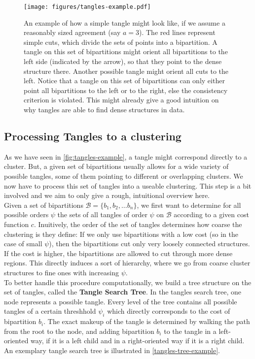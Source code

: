\begin{figure}[h]
    \centering
    \texttt{[image: figures/tangles-example.pdf]}
    \caption{An example of how a simple tangle might look like, if we assume a reasonably sized agreement (say $a = 3$). The red lines represent simple cuts, which divide the sets of points into a bipartition.
    A tangle on this set of bipartitions might orient all bipartitions to the left side (indicated by the arrow), so that they point to the dense structure there. Another 
possible tangle might orient all cuts to the left. Notice that a tangle on this set of bipartitions can only either point all bipartitions to the left or to the right, else
the consistency criterion is violated. This might already give a good intuition on why tangles are able to find dense structures in data.}
    \label{fig:tangles-example}
\end{figure}
\FloatBarrier

\subsection{Processing Tangles to a clustering}
As we have seen in \autoref{fig:tangles-example}, a tangle might correspond directly to a cluster. But, a given set of bipartitions usually allows for a wide 
variety of possible tangles, some of them pointing to different or overlapping clusters. We now have to process this set of tangles into a useable clustering.
This step is a bit involved and we aim to only give a rough, intuitional overview here. \\

Given a set of bipartitions $\mathcal{B} = \{b_1, b_2, \ldots b_n\} $, we first want to determine for all possible orders $\psi$ the sets of all tangles of order $\psi$ on $\mathcal{B}$ 
according to a given cost function $c$. Inuitively, the order of the set of tangles determines how coarse the clustering is they define:
If we only use bipartitions with a low cost (so in the case of small $\psi$), then the bipartitions cut only very loosely connected structures. 
If the cost is higher, the bipartitions are allowed to cut through more dense regions. This directly induces a sort of hierarchy, where we go from coarse cluster
structures to fine ones with increasing $\psi$. \\
To better handle this procedure computationally, we build a tree structure on the set of tangles, called the \textbf{Tangle Search Tree}. In the tangles search tree, 
one node represents a possible tangle. Every level of the tree contains all possible tangles of a certain threshhold $\psi_i$ which directly corresponds to the cost of bipartition $b_i$. 
The exact makeup of the tangle is determined by walking the path from the root to the node, and adding bipartition $b_i$ to the tangle in a left-oriented way, if it is a left child and
in a right-oriented way if it is a right child. An exemplary tangle search tree is illustrated in \autoref{tangles-tree-example}.

